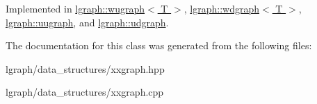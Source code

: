 Implemented in \hyperlink{classlgraph_1_1wugraph_ad8eff47efc751e7bc5aa10b79ff70633}{lgraph\-::wugraph$<$ T $>$}, \hyperlink{classlgraph_1_1wdgraph_aa6861b63fccd1def268f3ff84d31da52}{lgraph\-::wdgraph$<$ T $>$}, \hyperlink{classlgraph_1_1uugraph_aa7f32c48d008edaa4992eb72a176e806}{lgraph\-::uugraph}, and \hyperlink{classlgraph_1_1udgraph_a043aab345008c5eedb4cf429f85e99df}{lgraph\-::udgraph}.



The documentation for this class was generated from the following files\-:\begin{DoxyCompactItemize}
\item 
lgraph/data\-\_\-structures/xxgraph.\-hpp\item 
lgraph/data\-\_\-structures/xxgraph.\-cpp\end{DoxyCompactItemize}
